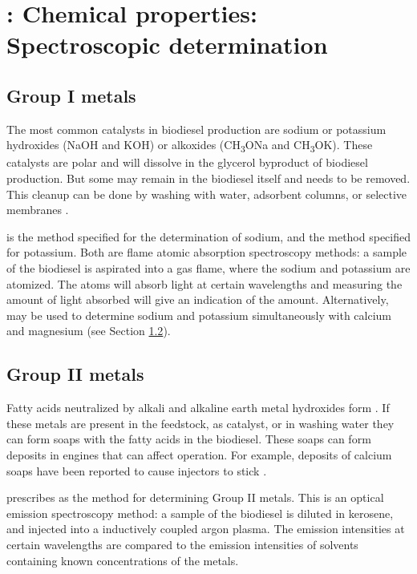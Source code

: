 \section{: Chemical properties: Spectroscopic determination}

\subsection{Group I metals}

The most common catalysts in biodiesel production are sodium or potassium
hydroxides (NaOH and KOH) or alkoxides (CH\textsubscript{3}ONa and
CH\textsubscript{3}OK). These catalysts are polar and will dissolve in the
glycerol byproduct of biodiesel production. But some may remain in the biodiesel
itself and needs to be removed. This cleanup can be done by washing with water,
adsorbent columns, or selective membranes \autocite{Atadashi2011}.

 is the method specified for the determination of sodium, and
 the method specified for potassium. Both are flame atomic
absorption spectroscopy methods: a sample of the biodiesel is aspirated into a
gas flame, where the sodium and potassium are atomized. The atoms will absorb
light at certain wavelengths and measuring the amount of light absorbed will
give an indication of the amount. Alternatively,  may be used to
determine sodium and potassium simultaneously with calcium and magnesium (see
Section \ref{sec:GroupIIMetals}).

\subsection{Group II metals}
\label{sec:GroupIIMetals}

Fatty acids neutralized by alkali and alkaline earth metal hydroxides form
. If these metals are present in the feedstock, as catalyst, or
in washing water they can form soaps with the fatty acids in the biodiesel.
These soaps can form deposits in engines that can affect operation. For example,
deposits of calcium soaps have been reported to cause injectors to stick
\autocite{Pischinger2000}.

 prescribes  as the method for determining Group II
metals. This is an optical emission spectroscopy method: a sample of the
biodiesel is diluted in kerosene, and injected into a inductively coupled argon
plasma. The emission intensities at certain wavelengths are compared to the
emission intensities of solvents containing known concentrations of the metals.

